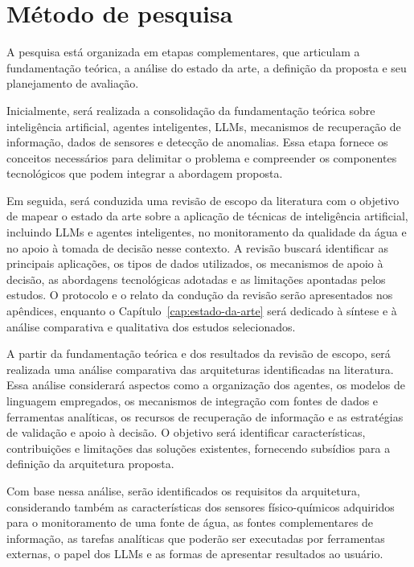 \section{Método de pesquisa}
\label{sec:metodo-pesquisa}

A pesquisa está organizada em etapas complementares, que articulam a fundamentação teórica, a análise do estado da arte, a definição da proposta e seu planejamento de avaliação.

Inicialmente, será realizada a consolidação da fundamentação teórica sobre inteligência artificial, agentes inteligentes, LLMs, mecanismos de recuperação de informação, dados de sensores e detecção de anomalias. Essa etapa fornece os conceitos necessários para delimitar o problema e compreender os componentes tecnológicos que podem integrar a abordagem proposta.

Em seguida, será conduzida uma revisão de escopo da literatura com o objetivo de mapear o estado da arte sobre a aplicação de técnicas de inteligência artificial, incluindo LLMs e agentes inteligentes, no monitoramento da qualidade da água e no apoio à tomada de decisão nesse contexto. A revisão buscará identificar as principais aplicações, os tipos de dados utilizados, os mecanismos de apoio à decisão, as abordagens tecnológicas adotadas e as limitações apontadas pelos estudos. O protocolo e o relato da condução da revisão serão apresentados nos apêndices, enquanto o Capítulo~\ref{cap:estado-da-arte} será dedicado à síntese e à análise comparativa e qualitativa dos estudos selecionados.

A partir da fundamentação teórica e dos resultados da revisão de escopo, será realizada uma análise comparativa das arquiteturas identificadas na literatura. Essa análise considerará aspectos como a organização dos agentes, os modelos de linguagem empregados, os mecanismos de integração com fontes de dados e ferramentas analíticas, os recursos de recuperação de informação e as estratégias de validação e apoio à decisão. O objetivo será identificar características, contribuições e limitações das soluções existentes, fornecendo subsídios para a definição da arquitetura proposta.

Com base nessa análise, serão identificados os requisitos da arquitetura, considerando também as características dos sensores físico-químicos adquiridos para o monitoramento de uma fonte de água, as fontes complementares de informação, as tarefas analíticas que poderão ser executadas por ferramentas externas, o papel dos LLMs e as formas de apresentar resultados ao usuário.

